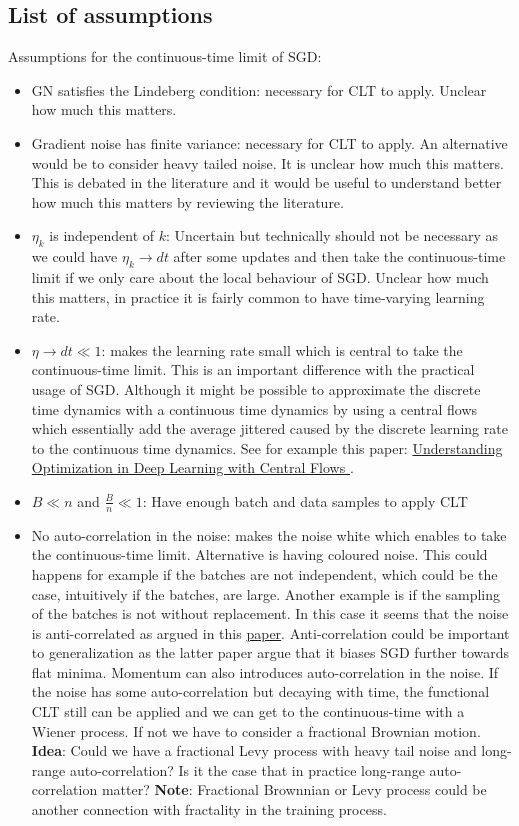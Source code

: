 \documentclass[11pt]{article}
\begin{document}
\subsection{List of assumptions}

Assumptions for the continuous-time limit of SGD:
\begin{itemize}
    \item GN satisfies the Lindeberg condition: necessary for CLT to apply. Unclear how much this matters.
    \item Gradient noise has finite variance: necessary for CLT to apply. An alternative would be to consider heavy tailed noise. It is unclear how much this matters. This is debated in the literature and it would be useful to understand better how much this matters by reviewing the literature.
    \item $\eta_k$ is independent of $k$: Uncertain but technically should not be necessary as we could have $\eta_k \to dt$ after some updates and then take the continuous-time limit if we only care about the local behaviour of SGD. Unclear how much this matters, in practice it is fairly common to have time-varying learning rate. 
    \item $\eta \to dt \ll 1$: makes the learning rate small which is central to take the continuous-time limit. This is an important difference with the practical usage of SGD. Although it might be possible to approximate the discrete time dynamics with a continuous time dynamics by using a central flows which essentially add the average jittered caused by the discrete learning rate to the continuous time dynamics. See for example this paper: \href{https://arxiv.org/abs/2410.24206}{Understanding Optimization in Deep Learning with Central Flows
    }.
    \item $B \ll n$ and $\frac{B}{n} \ll 1$: Have enough batch and data samples to apply CLT
    \item No auto-correlation in the noise: makes the noise white which enables to take the continuous-time limit. Alternative is having coloured noise. This could happens for example if the batches are not independent, which could be the case, intuitively if the batches, are large. Another example is if the sampling of the batches is not without replacement. In this case it seems that the noise is anti-correlated as argued in this \href{https://openreview.net/forum?id=1QTFfyUePA&noteId=1QTFfyUePA}{paper}. Anti-correlation could be important to generalization as the latter paper argue that it biases SGD further towards flat minima. Momentum can also introduces auto-correlation in the noise. If the noise has some auto-correlation but decaying with time, the functional CLT still can be applied and we can get to the continuous-time with a Wiener process. If not we have to consider a fractional Brownian motion. \textbf{Idea}: Could we have a fractional Levy process with heavy tail noise and long-range auto-correlation? Is it the case that in practice long-range auto-correlation matter? \textbf{Note}: Fractional Brownnian or Levy process could be another connection with fractality in the training process.

\end{itemize}
\end{document}
